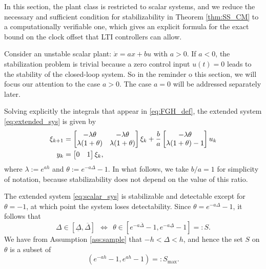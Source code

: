 \documentclass[letterpaper, 12pt, draftcls, onecolumn]{ieeeconf}
\begin{document}
In this section, the plant class is restricted to scalar systems, 
and we reduce the necessary and sufficient condition for stabilizability
in Theorem \ref{thm:SS_CM} to a computationally verifiable one,
which gives an explicit formula for the exact bound on
the clock offset that LTI controllers can allow.


Consider an unstable scalar plant:
$
\dot x = a x + bu
$ 
with $a > 0$.
If $a < 0$, the stabilization problem is trivial because a
zero control input $u(t) = 0$ leads to the stability of the closed-loop system.
So in the reminder o this section, 
we will focus our attention to the case $a > 0$.
The case $a=0$ will be addressed separately later.

Solving explicitly the integrals that appear in \eqref{eq:FGH_def},
the extended system \eqref{eq:extended_sys} is given by
\begin{align}
\xi_{k+1}
&=
\begin{bmatrix}
-\lambda \theta & -\lambda\theta \\
\lambda(1+\theta) & \lambda(1+\theta)
\end{bmatrix} \xi_k
+
\frac{b}{a}
\begin{bmatrix}
-\lambda \theta \\
\lambda(1+\theta) - 1
\end{bmatrix}
u_k \notag \\
y_k &= 
\begin{bmatrix}
0 & 1
\end{bmatrix}
\xi_k,
\label{eq:scalar_sys}
\end{align}
where
$
\lambda := e^{ah}
$ and
$
\theta := e^{-a\Delta} - 1.
$
In what follows, we take $b/a = 1$ for simplicity of notation,
because stabilizability does not depend on the value of this ratio.


The extended system \eqref{eq:scalar_sys}
is stabilizable and detectable except for $\theta = -1$, at which
point the system loses detectability. 
Since $\theta = e^{-a\Delta} - 1$, 
it follows that 
\begin{equation}
\label{eq:Delta_theta}
\Delta \in [\underline{\Delta}, \overline{\Delta}] ~~
\Leftrightarrow
~~
\theta \in [e^{-a\overline{\Delta}}-1, e^{-a\underline{\Delta}}-1] =: S.
\end{equation}
We have from Assumption \ref{ass:sample} 
that $-h < \Delta < h$, and hence
the set $S$ on $\theta$ is a subset of
\begin{equation}
\label{eq:Imax_def}
(e^{-ah} - 1,e^{ah} - 1) =: S_{\max}.
\end{equation}
\end{document}
